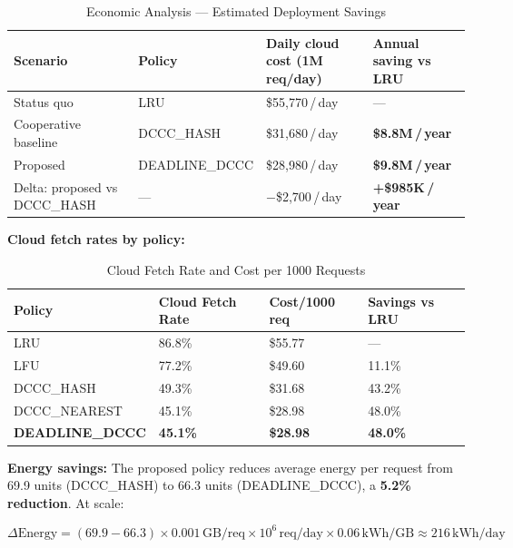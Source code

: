 \documentclass[12pt,a4paper]{report}
\begin{document}
\begin{table}[H]
\centering
\caption{Economic Analysis --- Estimated Deployment Savings}
\label{tab:economic}
\renewcommand{\arraystretch}{1.3}
\begin{tabular}{L{3.5cm} L{4cm} L{3.5cm} L{3.5cm}}
\toprule
\textbf{Scenario} & \textbf{Policy} & \textbf{Daily cloud cost (1M req/day)} & \textbf{Annual saving vs LRU}\\
\midrule
Status quo           & LRU             & \$55{,}770\,/\,day & ---\\
Cooperative baseline & DCCC\_HASH      & \$31{,}680\,/\,day & \textbf{\$8.8M\,/\,year}\\
Proposed             & DEADLINE\_DCCC  & \$28{,}980\,/\,day & \textbf{\$9.8M\,/\,year}\\
Delta: proposed vs DCCC\_HASH & ---      & $-$\$2{,}700\,/\,day & \textbf{+\$985K\,/\,year}\\
\bottomrule
\end{tabular}
\end{table}

\textbf{Cloud fetch rates by policy:}

\begin{table}[H]
\centering
\caption{Cloud Fetch Rate and Cost per 1000 Requests}
\label{tab:fetchrate}
\renewcommand{\arraystretch}{1.3}
\begin{tabular}{L{4cm} R{3cm} R{3cm} R{3cm}}
\toprule
\textbf{Policy} & \textbf{Cloud Fetch Rate} & \textbf{Cost/1000 req} & \textbf{Savings vs LRU}\\
\midrule
LRU             & 86.8\% & \$55.77 & ---\\
LFU             & 77.2\% & \$49.60 & 11.1\%\\
DCCC\_HASH      & 49.3\% & \$31.68 & 43.2\%\\
DCCC\_NEAREST   & 45.1\% & \$28.98 & 48.0\%\\
\textbf{DEADLINE\_DCCC} & \textbf{45.1\%} & \textbf{\$28.98} & \textbf{48.0\%}\\
\bottomrule
\end{tabular}
\end{table}

\textbf{Energy savings:}
The proposed policy reduces average energy per request from 69.9 units (DCCC\_HASH)
to 66.3 units (DEADLINE\_DCCC), a \textbf{5.2\% reduction}. At scale:

\begin{equation}
  \Delta\text{Energy} = (69.9 - 66.3) \times 0.001\,\text{GB/req} \times 10^6\,\text{req/day}
  \times 0.06\,\text{kWh/GB} \approx 216\,\text{kWh/day}
  \label{eq:energy}
\end{equation}
\end{document}
